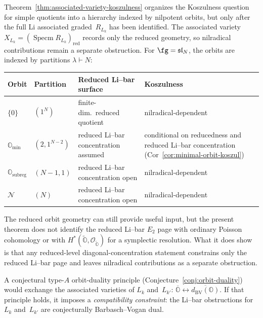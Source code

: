 \begin{remark}
\label{rem:orbit-hierarchy-koszulness}

Theorem~\ref{thm:associated-variety-koszulness} organizes the
Koszulness question for simple quotients into a hierarchy indexed
by nilpotent orbits, but only after the full Li associated
graded~$R_{L_k}$ has been identified. The associated variety
$X_{L_k}=(\operatorname{Specm}R_{L_k})_{\mathrm{red}}$ records only
the reduced geometry, so nilradical contributions remain a
separate obstruction.
For $\fg = \mathfrak{sl}_N$, the orbits are indexed by
partitions $\lambda \vdash N$:

\smallskip
\begin{center}
\begin{tabular}{llll}
\toprule
\textbf{Orbit} & \textbf{Partition} &
 \textbf{Reduced Li--bar surface} & \textbf{Koszulness} \\
\midrule
$\{0\}$ & $(1^N)$ &
 finite-dim.\ reduced quotient & nilradical-dependent \\
$\mathbb{O}_{\min}$ & $(2, 1^{N-2})$ &
 reduced Li--bar concentration assumed &
 conditional on reducedness and reduced
 Li--bar concentration
 \textup{(}Cor~\ref{cor:minimal-orbit-koszul}\textup{)} \\
$\mathbb{O}_{\mathrm{subreg}}$ & $(N{-}1, 1)$ &
 reduced Li--bar concentration open & nilradical-dependent \\
$\mathcal{N}$ & $(N)$ &
 reduced Li--bar concentration open & nilradical-dependent \\
\bottomrule
\end{tabular}
\end{center}

\smallskip\noindent
The reduced orbit geometry can still provide useful input, but
the present theorem does not identify the reduced Li--bar
$E_2$ page with ordinary Poisson cohomology or with
$H^*(\widetilde{\mathbb{O}}, \mathcal{O}_{\widetilde{\mathbb{O}}})$
for a symplectic resolution. What it does show is that any
reduced-level diagonal-concentration statement constrains only the
reduced Li--bar page and leaves nilradical contributions as a
separate obstruction.

A conjectural type-$A$ orbit-duality principle
\textup{(}Conjecture~\textup{\ref{conj:orbit-duality}}\textup{)}
would exchange the associated varieties of $L_k$ and~$L_{k'}$:
$\overline{\mathbb{O}} \leftrightarrow
\overline{d_{\mathrm{BV}}(\mathbb{O})}$. If that principle holds,
it imposes a \emph{compatibility constraint}: the Li--bar
obstructions for~$L_k$ and~$L_{k'}$ are conjecturally
Barbasch--Vogan dual.
\end{remark}

